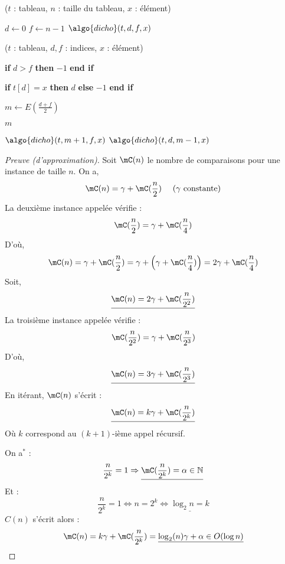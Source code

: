 




\begin{algorithm}[H]
\caption{($t$ : tableau, $n$ : taille du tableau, $x$ : élément)}
\begin{algorithmic}[1]
\State $d \gets 0$ 
\State $f \gets n-1$ 
\State\Return $\algo{dicho}(t, d, f, x)$
\end{algorithmic}
\end{algorithm}

\begin{algorithm}[H]
\caption{($t$ : tableau, $d,f$ : indices, $x$ : élément)}
\label{dicho}
\begin{algorithmic}[1]
\State \textbf{if} $d > f$ \textbf{then} \Return $-1$ \textbf{end if}

	\State \textbf{if} $t[d] = x$ \textbf{then} \Return $d$  
	\textbf{else} \Return $-1$ \textbf{end if} 
\EndIf

\State $m \gets  E(\frac{d+f}{2})$	

	\State\Return $m$
\EndIf

	\State\Return $\algo{dicho}(t, m+1, f, x)$
\Else
	\State\Return $\algo{dicho}(t, d, m-1, x)$
\EndIf
\end{algorithmic}
\end{algorithm}



\begin{proof}[Preuve (d'approximation)]
Soit $\mC(n)$ le nombre de comparaisons pour une instance de taille $n$.
On a, 
$$
\mC(n) = \gamma + \mC(\frac{n}{2}) 
	~~~~ ( \gamma \text{ constante} ) 
	$$
La deuxième instance appelée vérifie :
$$
\mC(\frac{n}{2}) = \gamma + \mC(\frac{n}{4})
	$$
D'où, 
$$
\mC(n) = \gamma + \mC(\frac{n}{2}) 
		= \gamma + \Big( \gamma + \mC(\frac{n}{4}) \Big)
		= 2\gamma + \mC(\frac{n}{4})
	$$
Soit, 
$$
\underline{\mC(n) = 2\gamma +  \mC(\frac{n}{2^2})
}
	$$
La troisième instance appelée vérifie :
$$
\mC(\frac{n}{2^2}) = \gamma +  \mC(\frac{n}{2^3})
	$$
D'où, 
$$
\underline{\mC(n) = 3\gamma +  \mC(\frac{n}{2^3})
}
	$$
En itérant, $\mC(n)$ s'écrit : 
$$
\underline{
\mC(n) = k\gamma +  \mC(\frac{n}{2^k})
}
	$$
Où $k$ correspond au $(k+1)$-ième appel récursif.

On a$^*$ :
$$
		\frac{n}{2^k} = 1 
	\Rightarrow
		\underline{ \mC(\frac{n}{2^k}) = \alpha \in\mathbb{N}}
	$$
Et : 
$$
		\frac{n}{2^k} = 1 
	\iff
		n = 2^k
	\iff 
		\underline{ \log_2 n = k}
	$$
$C(n)$ s'écrit alors :
$$
	\mC(n) = k\gamma +  \mC(\frac{n}{2^k})
	= 
		\underline{\log_2 (n) \gamma + \alpha \in O(\log n)}
	$$
\end{proof}

